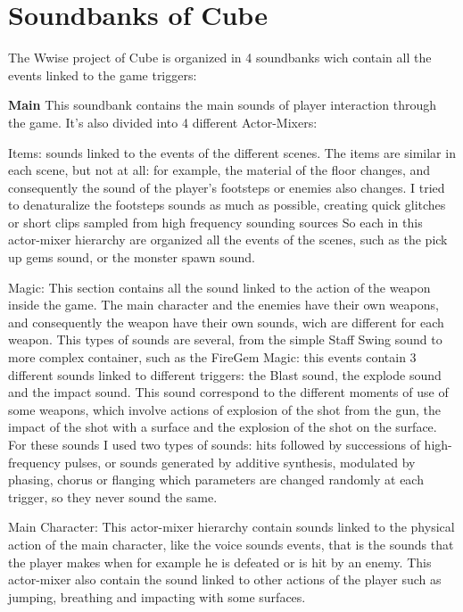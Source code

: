 \section{Soundbanks of Cube}
The Wwise project of Cube is organized in 4 soundbanks wich contain all the events linked to the game triggers:
	
	\begin{compactitem}
		\item \textbf{Main} This soundbank contains the main sounds of player interaction through the game. It's also divided into 4 different Actor-Mixers:
			\begin{compactitem}
				\item Items: sounds linked to the events of the different scenes. The items are similar in each scene, but not at all: for example, the material of the floor changes, and consequently the sound of the player's footsteps or enemies also changes.
				I tried to denaturalize the footsteps sounds as much as possible, creating quick glitches or short clips sampled from high frequency sounding sources
				So each in this actor-mixer hierarchy are organized all the events of the scenes, such as the pick up gems sound, or the monster spawn sound.
				\item Magic: This section contains all the sound linked to the action of the weapon inside the game. The main character and the enemies have their own weapons, and consequently the weapon have their own sounds, wich are different for each weapon. This types of sounds are several, from the simple Staff Swing sound to more complex container, such as the FireGem Magic: this events contain 3 different sounds linked to different triggers: the Blast sound, the explode sound and the impact sound. This sound correspond to the different moments of use of some weapons, which involve actions of explosion of the shot from the gun, the impact of the shot with a surface and the explosion of the shot on the surface.
				For these sounds I used two types of sounds: hits followed by successions of high-frequency pulses, or sounds generated by additive synthesis, modulated by phasing, chorus or flanging which parameters are changed randomly at each trigger, so they never sound the same.
				\item Main Character: This actor-mixer hierarchy contain sounds linked to the physical action of the main character, like the voice sounds events, that is the sounds that the player makes when for example he is defeated or is hit by an enemy. This actor-mixer also contain the sound linked to other actions of the player such as jumping, breathing and impacting with some surfaces.

\end{compactitem}
\end{compactitem}
